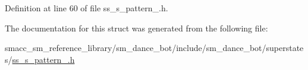Definition at line 60 of file ss\+\_\+s\+\_\+pattern\+\_.\+h.



The documentation for this struct was generated from the following file\+:\begin{DoxyCompactItemize}
\item 
smacc\+\_\+sm\+\_\+reference\+\_\+library/sm\+\_\+dance\+\_\+bot/include/sm\+\_\+dance\+\_\+bot/superstates/\hyperlink{ss__s__pattern__1_8h}{ss\+\_\+s\+\_\+pattern\+\_.\+h}\end{DoxyCompactItemize}
